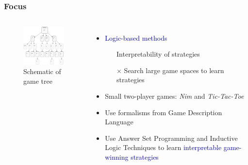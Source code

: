\documentclass{beamer}
\newcommand\re[1]{\textcolor{darkblue}{#1}}
\begin{document}
\subsection{}
\begin{framefont}{\footnotesize}
  \begin{frame}
    \frametitle{Focus}
    \begin{columns}
      \begin{figure}
        \centering
        \includegraphics[trim={0cm -1cm 0cm 0cm},clip,width=5cm]{tree.png}
        \caption{Schematic of game tree}
      \end{figure}
      \begin{itemize}[<+->]
        \setlength\itemsep{1.2em}
      \item \re{Logic-based methods} 
      \begin{itemize}
        \item[\checkmark] Interpretability of strategies
        \item[$\bm{\times}$] Search large game spaces to learn strategies
      \end{itemize}
      \item Small two-player games: \textit{Nim} and \textit{Tic-Tac-Toe}

      \item Use formalisms from Game Description Language
      \item Use Answer Set Programming and Inductive Logic Techniques to learn \re{interpretable game-winning strategies}
      \end{itemize}
    \end{columns}
  \end{frame}
\end{framefont}
\end{document}
